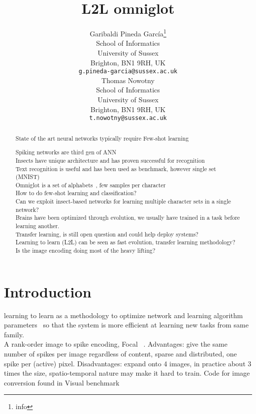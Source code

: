 \documentclass[sigconf]{acmart}
\title{L2L omniglot }
\author{
  Garibaldi {Pineda Garc{\'i}a}\thanks{info} \\
  School of Informatics\\
  University of Sussex\\
  Brighton, BN1 9RH, UK \\ 
  \texttt{g.pineda-garcia@sussex.ac.uk} \\
   \And
  Thomas Nowotny \\
  School of Informatics\\
  University of Sussex\\
  Brighton, BN1 9RH, UK \\ 
  \texttt{t.nowotny@sussex.ac.uk} \\
}
\begin{document}
\maketitle

\begin{abstract}

State of the art neural networks typically require Few-shot learning 

Spiking networks are third gen of ANN\\

Insects have unique architecture and has proven successful for recognition\\

Text recognition is useful and has been used as benchmark, however single set (MNIST)\\

Omniglot is a set of alphabets~\cite{Lake1332}, few samples per character\\

How to do few-shot learning and classification?\\

Can we exploit insect-based networks for learning multiple character sets in a single network?\\

Brains have been optimized through evolution, we usually have trained in a task before learning another.\\

Transfer learning, is still open question and could help deploy systems?\\

Learning to learn (L2L) can be seen as fast evolution, transfer learning methodology?\\

Is the image encoding doing most of the heavy lifting?
\end{abstract}




\section{Introduction}
learning to learn as a methodology to optimize network and learning algorithm parameters~\cite{Thrun-1998-16516} so that the system is more efficient at learning new tasks from same family.\\


A rank-order image to spike encoding, Focal~\cite{5484611} .
Advantages: give the same number of spikes per image regardless of content, sparse and distributed, one spike per (active) pixel.
Disadvantages: expand onto 4 images, in practice about 3 times the size, spatio-temporal nature may make it hard to train.
Code for image conversion found in Visual benchmark~\cite{10.3389/fnins.2016.00496}\\
\end{document}
